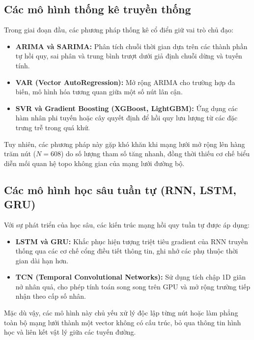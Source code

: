 \subsection{Các mô hình thống kê truyền thống}
Trong giai đoạn đầu, các phương pháp thống kê cổ điển giữ vai trò chủ đạo:
\begin{itemize}
    \item \textbf{ARIMA và SARIMA:} Phân tích chuỗi thời gian dựa trên các thành phần tự hồi quy, sai phân và trung bình trượt dưới giả định chuỗi dừng và tuyến tính.
    \item \textbf{VAR (Vector AutoRegression):} Mở rộng ARIMA cho trường hợp đa biến, mô hình hóa tương quan giữa một số nút lân cận.
    \item \textbf{SVR và Gradient Boosting (XGBoost, LightGBM):} Ứng dụng các hàm nhân phi tuyến hoặc cây quyết định để hồi quy lưu lượng từ các đặc trưng trễ trong quá khứ.
\end{itemize}
Tuy nhiên, các phương pháp này gặp khó khăn khi mạng lưới mở rộng lên hàng trăm nút ($N = 608$) do số lượng tham số tăng nhanh, đồng thời thiếu cơ chế biểu diễn mối quan hệ topo không gian của mạng lưới đường bộ.

\subsection{Các mô hình học sâu tuần tự (RNN, LSTM, GRU)}
Với sự phát triển của học sâu, các kiến trúc mạng hồi quy tuần tự được áp dụng:
\begin{itemize}
    \item \textbf{LSTM và GRU:} Khắc phục hiện tượng triệt tiêu gradient của RNN truyền thống qua các cơ chế cổng điều tiết thông tin, ghi nhớ các phụ thuộc thời gian dài hạn hơn.
    \item \textbf{TCN (Temporal Convolutional Networks):} Sử dụng tích chập 1D giãn nở nhân quả, cho phép tính toán song song trên GPU và mở rộng trường tiếp nhận theo cấp số nhân.
\end{itemize}
Mặc dù vậy, các mô hình này chủ yếu xử lý độc lập từng nút hoặc làm phẳng toàn bộ mạng lưới thành một vector không có cấu trúc, bỏ qua thông tin hình học và liên kết vật lý giữa các tuyến đường.

